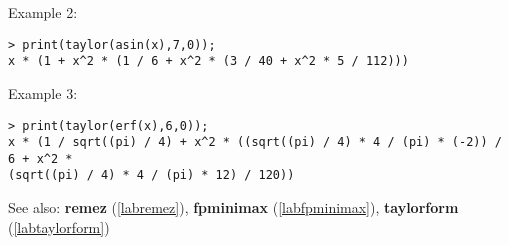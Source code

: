 \noindent Example 2: 
\begin{center}\begin{minipage}{15cm}\begin{Verbatim}[frame=single,commandchars=\\\|\~]
> print(taylor(asin(x),7,0));
x * (1 + x^2 * (1 / 6 + x^2 * (3 / 40 + x^2 * 5 / 112)))
\end{Verbatim}
\end{minipage}\end{center}
\noindent Example 3: 
\begin{center}\begin{minipage}{15cm}\begin{Verbatim}[frame=single,commandchars=\\\|\~]
> print(taylor(erf(x),6,0));
x * (1 / sqrt((pi) / 4) + x^2 * ((sqrt((pi) / 4) * 4 / (pi) * (-2)) / 6 + x^2 * 
(sqrt((pi) / 4) * 4 / (pi) * 12) / 120))
\end{Verbatim}
\end{minipage}\end{center}
See also: \textbf{remez} (\ref{labremez}), \textbf{fpminimax} (\ref{labfpminimax}), \textbf{taylorform} (\ref{labtaylorform})
